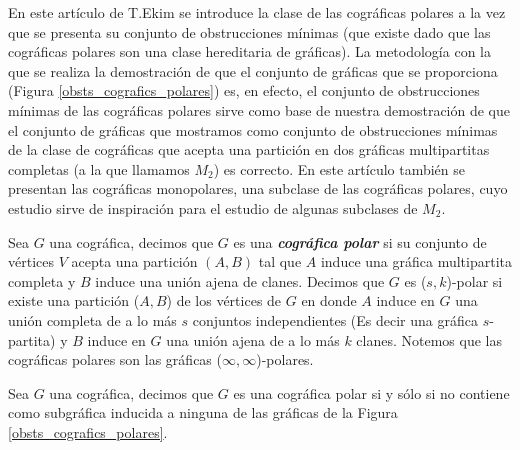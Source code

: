 En este artículo de T.Ekim \cite{Ekim} se introduce la clase de las cográficas polares a la vez que se presenta su conjunto de obstrucciones mínimas (que existe dado que las cográficas polares son una clase hereditaria de gráficas). La metodología con la que se realiza la demostración de que el conjunto de gráficas que se proporciona (Figura \ref{obsts_cografics_polares}) es, en efecto, el conjunto de obstrucciones mínimas de las cográficas polares sirve como base de nuestra demostración de que el conjunto de gráficas que mostramos como conjunto de obstrucciones mínimas de la clase de cográficas que acepta una partición en dos gráficas multipartitas completas (a la que llamamos $M_2$) es correcto. En este artículo también se presentan las cográficas monopolares, una subclase de las cográficas polares, cuyo estudio sirve de inspiración para el estudio de algunas subclases de $M_2$. 

Sea $G$ una cográfica, decimos que $G$ es una \emph{\textbf{cográfica polar}} si su conjunto de vértices $V$ acepta una partición $(A,B)$ tal que $A$ induce una gráfica multipartita completa y $B$ induce una unión ajena de clanes.
Decimos que $G$ es ($s,k$)-polar si existe una partición ($A,B$) de los vértices de $G$ en donde $A$ induce en $G$ una unión completa de a lo más $s$ conjuntos independientes (Es decir una gráfica $s$-partita) y $B$ induce en $G$ una unión ajena de a lo más $k$ clanes. Notemos que las cográficas polares son las gráficas ($\infty, \infty$)-polares.

\begin{theorem}
    Sea $G$ una cográfica, decimos que $G$ es una cográfica polar si y sólo si no contiene como subgráfica inducida a ninguna de las gráficas de la Figura \ref{obsts_cografics_polares}.
\end{theorem}

